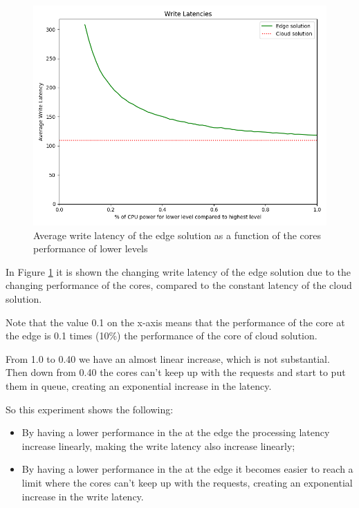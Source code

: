 \begin{figure}[H]
    \centering
    \includegraphics[width=0.86\linewidth]{Figures/Evaluation/write-all-cpu-latency.png}
    \caption{Average write latency of the edge solution as a function of the cores performance of lower levels}
    \label{fig:/write-all-cpu-latency}
\end{figure}

In Figure \ref{fig:/write-all-cpu-latency} it is shown the changing write latency of the edge solution due to the changing performance of the  cores, compared to the constant latency of the cloud solution.

Note that the value 0.1 on the x-axis means that the performance of the core at the edge is 0.1 times (10\%) the performance of the core of cloud solution.

From 1.0 to 0.40 we have an almost linear increase, which is not substantial. Then down from 0.40 the cores can't keep up with the requests and start to put them in queue, creating an exponential increase in the latency.

So this experiment shows the following:
\begin{itemize}
    \item By having a lower performance in the  at the edge the processing latency increase linearly, making the write latency also increase linearly;
    \item By having a lower performance in the  at the edge it becomes easier to reach a limit where the cores can't keep up with the requests, creating an exponential increase in the write latency.
\end{itemize}


